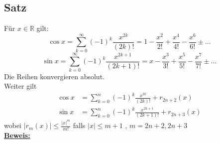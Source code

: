 \subsection{Satz} %
\label{sub:satz}
Für $x \in \mathds{R}$ gilt: 
\[
	\cos x = \sum\limits_{k=0}^{\infty} (-1)^k \frac{x^{2k}}{(2k)!} = 1 - \frac{x^2}{2!} + \frac{x^4}{4!} - \frac{x^6}{6!} \pm \ldots      
\]
\[
	\sin x = \sum\limits_{k=0}^{\infty} (-1)^k \frac{x^{2k+1}}{(2k+1)!} = x - \frac{x^3}{3!}  + \frac{x^5}{5!} - \frac{x^7}{7!}  \pm \ldots 
\]
Die Reihen konvergieren absolut.
\vspace{10pt} \\
Weiter gilt
\begin{align*}
	\cos x &= \sum\limits_{k=0}^{n} (-1)^k \frac{x^{2k}}{(2k)!}  + r_{2n+2} (x) \\
	\sin x &= \sum\limits_{k=0}^{n} (-1)^k \frac{x^{2k+1}}{(2k+1)!} + r_{2n+3}(x)  
\end{align*}
wobei $|r_m(x)|\le \frac{|x|^m}{m!} $ falls $|x| \le m+1$ , $m=2n+2 , 2n+3$
\vspace{\baselineskip} \\
\underline{\textbf{Beweis:}} \\
